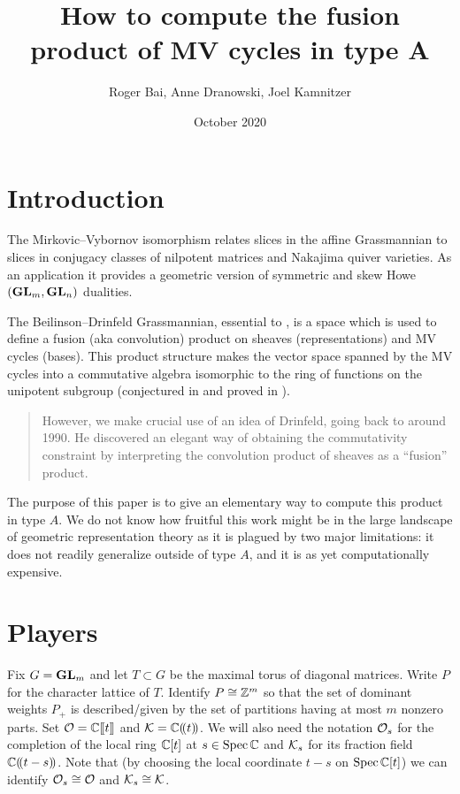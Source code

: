 \documentclass{article}
\title{How to compute the fusion product of MV cycles in type A}
\author{Roger Bai, Anne Dranowski, Joel Kamnitzer}
\date{October 2020}
\begin{document}
\maketitle

\section{Introduction}
% 
The Mirkovic--Vybornov isomorphism \cite{mirkovic2007quiver} relates slices in the affine Grassmannian to slices in conjugacy classes of nilpotent matrices and Nakajima quiver varieties. As an application it provides a geometric version of symmetric and skew Howe $(\GL_m,\GL_n)$ dualities. 
% 

The Beilinson--Drinfeld Grassmannian, essential to \cite{mirkovic2007geometric}, is a space which is used to define a fusion (aka convolution) product on sheaves (representations) and MV cycles (bases). 
% 
This product structure makes the vector space spanned by the MV cycles into a commutative algebra isomorphic to the ring of functions on the unipotent subgroup (conjectured in \cite{anderson2003polytope} and proved in \cite{baumann2020bases}). %
% 
\begin{quotation}
    However, we make crucial use of an idea of Drinfeld, going back to around 1990. He discovered an elegant way of obtaining the commutativity constraint by interpreting the convolution product of sheaves as a ``fusion'' product.
\end{quotation}

The purpose of this paper is to give an elementary way to compute this product in type $A$. We do not know how fruitful this work might be in the large landscape of geometric representation theory as it is plagued by two major limitations: it does not readily generalize outside of type $A$, and it is as yet computationally expensive. 

\section{Players}

Fix $G = \GL_m$ and let $T\subset G$ be the maximal torus of diagonal matrices. 
Write $P$ for the character lattice of $T$. Identify $P\cong \ZZ^m$ so that the set of dominant weights $P_+$ is described/given by the set of partitions having at most $m$ nonzero parts. Set $\cO = \CC\xt$ and $\cK = \CC\xT$. We will also need the notation $\cO_s$ for the completion of the local ring $\CC[t]$ at $s\in\spec\CC$ and $\cK_s$ for its fraction field $\CC\xT[t-s]$. 
% 
Note that (by choosing the local coordinate $t-s$ on $\spec\CC[t]$) we can identify $\cO_s \cong \cO$ and $\cK_s\cong\cK$. 
\end{document}

